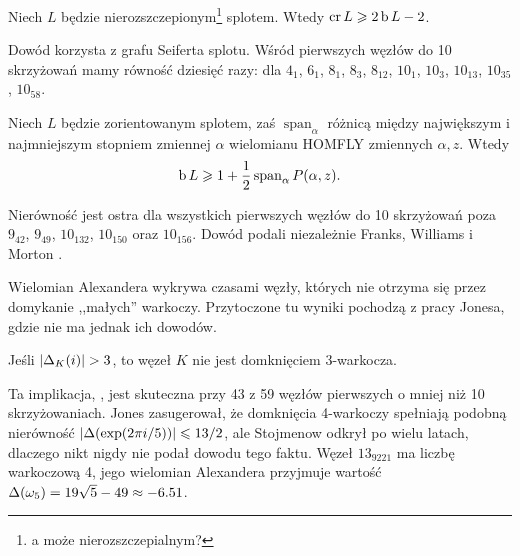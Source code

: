\begin{proposition}
    Niech $L$ będzie nierozszczepionym\footnote{a może nierozszczepialnym?} splotem.
    Wtedy $\operatorname{cr} L \geqslant 2 \operatorname{b} L - 2$.
\end{proposition}

Dowód korzysta z grafu Seiferta splotu.
%
Wśród pierwszych węzłów do 10 skrzyżowań mamy równość dziesięć razy: dla $4_1$, $6_1$, $8_1$, $8_3$, $8_{12}$, $10_1$, $10_3$, $10_{13}$, $10_{35}$, $10_{58}$.

\begin{proposition}
%
    Niech $L$ będzie zorientowanym splotem, zaś $\operatorname{span}_\alpha$ różnicą między największym i najmniejszym stopniem zmiennej $\alpha$ wielomianu HOMFLY zmiennych $\alpha, z$.
    Wtedy
    \begin{equation}
        \operatorname{b} L \geqslant 1 + \frac 1 2 \operatorname{span}_\alpha P(\alpha, z).
    \end{equation}
\end{proposition}

Nierówność jest ostra dla wszystkich pierwszych węzłów do 10 skrzyżowań poza $9_{42}$, $9_{49}$, $10_{132}$, $10_{150}$ oraz $10_{156}$.
Dowód podali niezależnie Franks, Williams \cite{franks87} i Morton \cite{morton88}.
%
%
%

Wielomian Alexandera wykrywa czasami węzły, których nie otrzyma się przez domykanie ,,małych'' warkoczy.
%
Przytoczone tu wyniki pochodzą z pracy \cite{jones85} Jonesa, gdzie nie ma jednak ich dowodów.

\begin{proposition}
    Jeśli $|\Delta_K(i)| > 3$, to węzeł $K$ nie jest domknięciem 3-warkocza.
\end{proposition}

Ta implikacja, \cite[wniosek 23]{jones85}, jest skuteczna przy 43 z 59 węzłów pierwszych o mniej niż 10 skrzyżowaniach.
Jones \cite[wniosek 24]{jones85} zasugerował, że domknięcia 4-warkoczy spełniają podobną nierówność $|\Delta (\exp (2\pi i / 5))| \leqslant 13/2$, ale Stojmenow \cite{stoimenow02} odkrył po wielu latach, dlaczego nikt nigdy nie podał dowodu tego faktu.
Węzeł $13_{9221}$ ma liczbę warkoczową 4, jego wielomian Alexandera przyjmuje wartość $\Delta(\omega_5) = 19\sqrt{5} - 49 \approx -6.51$.

